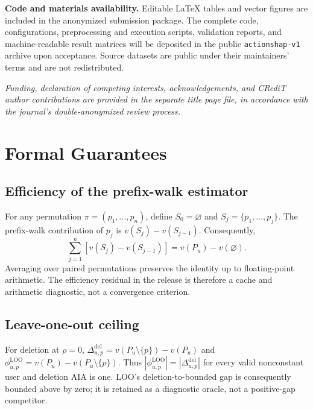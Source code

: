 \documentclass[a4paper,fleqn,doubleblind]{cas-sc}
\begin{document}
\textbf{Code and materials availability.} Editable LaTeX tables and vector figures are included in the anonymized submission package. The complete code, configurations, preprocessing and execution scripts, validation reports, and machine-readable result matrices will be deposited in the public \texttt{actionshap-v1} archive upon acceptance. Source datasets are public under their maintainers' terms and are not redistributed.



\noindent\textit{Funding, declaration of competing interests, acknowledgements, and CRediT author contributions are provided in the separate title page file, in accordance with the journal's double-anonymized review process.}



\appendix
\setcounter{section}{0}
\renewcommand{\thesection}{\Alph{section}}
\renewcommand{\thesubsection}{\thesection.\arabic{subsection}}
\renewcommand{\thetable}{\thesection.\arabic{table}}
\renewcommand{\theequation}{\thesection.\arabic{equation}}
\renewcommand{\theHsection}{appendix.\Alph{section}}
\renewcommand{\theHsubsection}{\theHsection.\arabic{subsection}}
\renewcommand{\theHtable}{\theHsection.\arabic{table}}
\renewcommand{\theHequation}{\theHsection.\arabic{equation}}
\setcounter{table}{0}
\setcounter{equation}{0}
\section{Formal Guarantees}\label{app:proofs}

\subsection{Efficiency of the prefix-walk estimator}
For any permutation $\pi=(p_1,\ldots,p_n)$, define $S_0=\varnothing$ and $S_j=\{p_1,\ldots,p_j\}$. The prefix-walk contribution of $p_j$ is $v(S_j)-v(S_{j-1})$. Consequently,
\begin{equation}
\sum_{j=1}^{n}\left[v(S_j)-v(S_{j-1})\right]=v(P_u)-v(\varnothing).
\end{equation}
Averaging over paired permutations preserves the identity up to floating-point arithmetic. The efficiency residual in the release is therefore a cache and arithmetic diagnostic, not a convergence criterion.

\subsection{Leave-one-out ceiling}
For deletion at $\rho=0$, $\Delta^{\mathrm{del}}_{u,p}=v(P_u\setminus\{p\})-v(P_u)$ and $\phi^{\mathrm{LOO}}_{u,p}=v(P_u)-v(P_u\setminus\{p\})$. Thus $|\phi^{\mathrm{LOO}}_{u,p}|=|\Delta^{\mathrm{del}}_{u,p}|$ for every valid nonconstant user and deletion AIA is one. LOO's deletion-to-bounded gap is consequently bounded above by zero; it is retained as a diagnostic oracle, not a positive-gap competitor.
\end{document}
